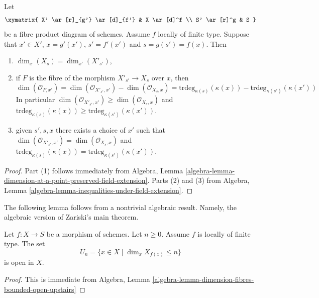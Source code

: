\begin{lemma}
\label{lemma-dimension-fibre-after-base-change}
Let
$$
\xymatrix{
X' \ar[r]_{g'} \ar[d]_{f'} & X \ar[d]^f \\
S' \ar[r]^g & S
}
$$
be a fibre product diagram of schemes. Assume $f$ locally of finite type.
Suppose that $x' \in X'$, $x = g'(x')$, $s' = f'(x')$ and
$s = g(s') = f(x)$. Then
\begin{enumerate}
\item $\dim_x(X_s) = \dim_{x'}(X'_{s'})$,
\item if $F$ is the fibre of the morphism $X'_{s'} \to X_s$
over $x$, then
$$
\dim(\mathcal{O}_{F, x'}) =
\dim(\mathcal{O}_{X'_{s'}, x'}) - \dim(\mathcal{O}_{X_s, x}) =
\text{trdeg}_{\kappa(s)}(\kappa(x)) -
\text{trdeg}_{\kappa(s')}(\kappa(x'))
$$
In particular $\dim(\mathcal{O}_{X'_{s'}, x'}) \geq \dim(\mathcal{O}_{X_s, x})$
and $\text{trdeg}_{\kappa(s)}(\kappa(x)) \geq
\text{trdeg}_{\kappa(s')}(\kappa(x'))$.
\item given $s', s, x$ there exists a choice of $x'$ such that
$\dim(\mathcal{O}_{X'_{s'}, x'}) = \dim(\mathcal{O}_{X_s, x})$ and
$\text{trdeg}_{\kappa(s)}(\kappa(x)) = \text{trdeg}_{\kappa(s')}(\kappa(x'))$.
\end{enumerate}
\end{lemma}

\begin{proof}
Part (1) follows immediately from
Algebra,
Lemma \ref{algebra-lemma-dimension-at-a-point-preserved-field-extension}.
Parts (2) and (3) from
Algebra, Lemma \ref{algebra-lemma-inequalities-under-field-extension}.
\end{proof}

\noindent
The following lemma follows from a nontrivial algebraic result.
Namely, the algebraic version of Zariski's main theorem.

\begin{lemma}
\label{lemma-openness-bounded-dimension-fibres}
\begin{reference}
\cite[IV Theorem 13.1.3]{EGA}
\end{reference}
Let $f : X \to S$ be a morphism of schemes.
Let $n \geq 0$. Assume $f$ is locally of finite type.
The set
$$
U_n = \{x \in X \mid \dim_x X_{f(x)} \leq n\}
$$
is open in $X$.
\end{lemma}

\begin{proof}
This is immediate from
Algebra,
Lemma \ref{algebra-lemma-dimension-fibres-bounded-open-upstairs}
\end{proof}

